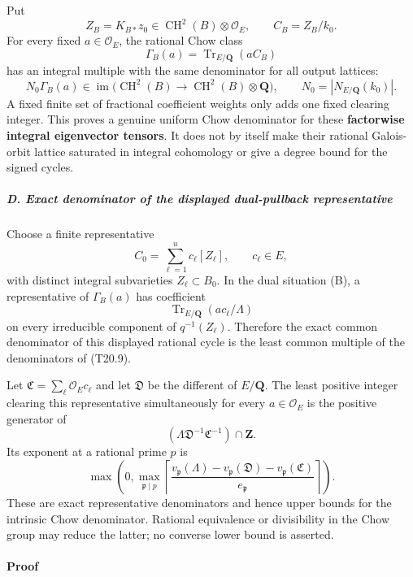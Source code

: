 Put \[
 Z_B=K_{B*}z_0\in\operatorname{CH}^2(B)\otimes\mathcal O_E,
 \qquad C_B=Z_B/k_0.
\] For every fixed \(a\in\mathcal O_E\), the rational Chow class \[
 \Gamma_B(a)=\operatorname{Tr}_{E/\mathbf Q}(a C_B)
\] has an integral multiple with the same denominator for all output lattices: \[
 N_0\Gamma_B(a)\in\operatorname{im}
 \bigl(\operatorname{CH}^2(B)\longrightarrow
                 \operatorname{CH}^2(B)\otimes\mathbf Q\bigr),
 \qquad
 N_0=|N_{E/\mathbf Q}(k_0)|.
 \tag{T20.7}
\] A fixed finite set of fractional coefficient weights only adds one fixed clearing integer. This proves a genuine uniform Chow denominator for these \textbf{factorwise integral eigenvector tensors}. It does not by itself make their rational Galois-orbit lattice saturated in integral cohomology or give a degree bound for the signed cycles.

\subparagraph{D. Exact denominator of the displayed dual-pullback representative}\label{d.-exact-denominator-of-the-displayed-dual-pullback-representative}

Choose a finite representative \[
 C_0=\sum_{\ell=1}^u c_\ell[Z_\ell],\qquad c_\ell\in E,
 \tag{T20.8}
\] with distinct integral subvarieties \(Z_\ell\subset B_0\). In the dual situation (B), a representative of \(\Gamma_B(a)\) has coefficient \[
 \operatorname{Tr}_{E/\mathbf Q}(a c_\ell/\Lambda)
 \tag{T20.9}
\] on every irreducible component of \(q^{-1}(Z_\ell)\). Therefore the exact common denominator of this displayed rational cycle is the least common multiple of the denominators of (T20.9).

Let \(\mathfrak C=\sum_\ell\mathcal O_Ec_\ell\) and let \(\mathfrak D\) be the different of \(E/\mathbf Q\). The least positive integer clearing this representative simultaneously for every \(a\in\mathcal O_E\) is the positive generator of \[
 (\Lambda\mathfrak D^{-1}\mathfrak C^{-1})\cap\mathbf Z.
 \tag{T20.10}
\] Its exponent at a rational prime \(p\) is \[
 \max\left(0,\max_{\mathfrak p\mid p}
 \left\lceil\frac{v_{\mathfrak p}(\Lambda)
                      -v_{\mathfrak p}(\mathfrak D)
                      -v_{\mathfrak p}(\mathfrak C)}{e_{\mathfrak p}}\right\rceil\right).
 \tag{T20.11}
\] These are exact representative denominators and hence upper bounds for the intrinsic Chow denominator. Rational equivalence or divisibility in the Chow group may reduce the latter; no converse lower bound is asserted.

\paragraph{Proof}\label{proof-1}

